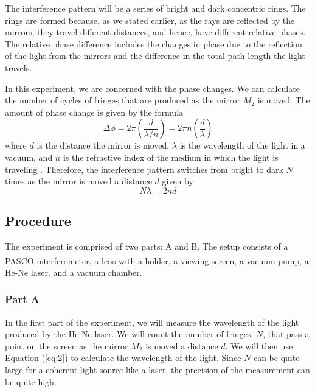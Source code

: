 \documentclass[10pt]{article}
\begin{document}
The interference pattern will be a series of bright and dark concentric rings. The rings are formed because, as we stated earlier, as the rays are reflected by the mirrors, they travel different distances, and hence, have different relative phases. The relative phase difference includes the changes in phase due to the reflection of the light from the mirrors and the difference in the total path length the light travels. 

In this experiment, we are concerned with the phase changes. We can calculate the number of cycles of fringes that are produced as the mirror $M_2$ is moved. The amount of phase change is given by the formula
\begin{equation}
  \Delta \phi = 2 \pi \left(\dfrac{d}{\lambda/n}\right) = 2 \pi n \left(\dfrac{d}{\lambda}\right)
  \label{eq:1}
\end{equation}
where $d$ is the distance the mirror is moved, $\lambda$ is the wavelength of the light in a vacuum, and $n$ is the refractive index of the medium in which the light is traveling \cite{Pedrotti_2006}. Therefore, the interference pattern switches from bright to dark $N$ times as the mirror is moved a distance $d$ given by
\begin{equation}
  N \lambda = 2 n d
  \label{eq:2}
\end{equation}

\subsection*{Procedure}

The experiment is comprised of two parts: A and B. The setup consists of a PASCO{\textsuperscript\textregistered} interferometer, a lens with a holder, a viewing screen, a vacuum pump, a He-Ne laser, and a vacuum chamber.

\subsubsection*{Part A}

In the first part of the experiment, we will measure the wavelength of the light produced by the He-Ne laser. We will count the number of fringes, $N$, that pass a point on the screen as the mirror $M_2$ is moved a distance $d$. We will then use Equation (\ref{eq:2}) to calculate the wavelength of the light. Since $N$ can be quite large for a coherent light source like a laser, the precision of the measurement can be quite high. 
\end{document}
